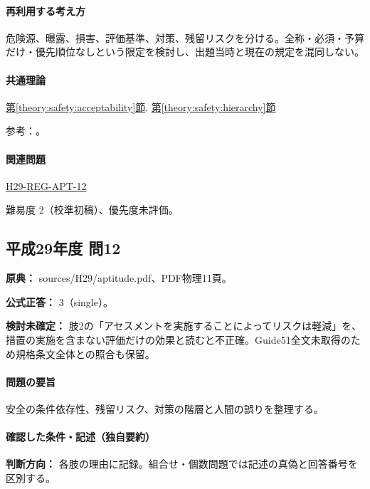 \paragraph{再利用する考え方} 危険源、曝露、損害、評価基準、対策、残留リスクを分ける。全称・必須・予算だけ・優先順位なしという限定を検討し、出題当時と現在の規定を混同しない。

\paragraph{共通理論} \hyperref[theory:safety:acceptability]{第\ref*{theory:safety:acceptability}節}, \hyperref[theory:safety:hierarchy]{第\ref*{theory:safety:hierarchy}節}

\par 参考：\cite{saf_guide51,saf_ra2006}。

\paragraph{関連問題} \hyperref[q:h29-reg-apt-12]{H29-REG-APT-12}

\par 難易度 2（校準初稿）、優先度未評価。

\subsection{平成29年度 問12}
\label{q:h29-reg-apt-12}

\noindent\textbf{原典：} sources/H29/aptitude.pdf、PDF物理11頁。

\textbf{公式正答：} 3（single）。

\par\textbf{検討未確定：} 肢2の「アセスメントを実施することによってリスクは軽減」を、措置の実施を含まない評価だけの効果と読むと不正確。Guide51全文未取得のため規格条文全体との照合も保留。

\paragraph{問題の要旨} 安全の条件依存性、残留リスク、対策の階層と人間の誤りを整理する。

\paragraph{確認した条件・記述（独自要約）}\mbox{}\par

\noindent\textbf{判断方向：} 各肢の理由に記録。組合せ・個数問題では記述の真偽と回答番号を区別する。\par

